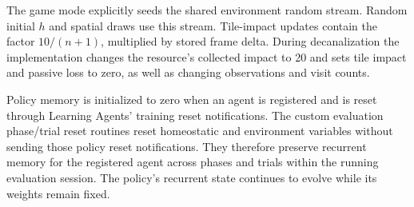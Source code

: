 The game mode explicitly seeds the shared environment random stream. Random initial $h$ and spatial draws use this stream. Tile-impact updates contain the factor $10/(n+1)$, multiplied by stored frame delta. During decanalization the implementation changes the resource's collected impact to 20 and sets tile impact and passive loss to zero, as well as changing observations and visit counts.

Policy memory is initialized to zero when an agent is registered and is reset through Learning Agents' training reset notifications. The custom evaluation phase/trial reset routines reset homeostatic and environment variables without sending those policy reset notifications. They therefore preserve recurrent memory for the registered agent across phases and trials within the running evaluation session. The policy's recurrent state continues to evolve while its weights remain fixed.
